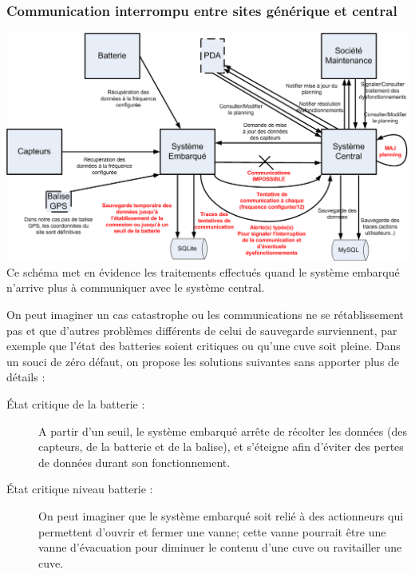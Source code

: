             \subsubsection{Communication interrompu entre sites générique et central}
            \includegraphics[width = \textwidth] {./img/CommunicationInterrompue.png}
Ce schéma met en évidence les traitements effectués quand le système embarqué n'arrive plus à communiquer 
avec le système central.

On peut imaginer un cas catastrophe ou les communications ne se rétablissement pas et que d'autres problèmes différents de celui de sauvegarde surviennent, par exemple que l'état des batteries soient critiques ou qu'une cuve soit pleine. Dans un souci de zéro défaut, on propose les solutions suivantes sans apporter plus de détails :
 \begin{description}
        \item[État critique de la batterie :] A partir d'un seuil, le système embarqué arrête de récolter les données (des capteurs, de la batterie et de la balise), et s'éteigne afin d'éviter des pertes de données durant son fonctionnement.
        \item[État critique niveau batterie :] On peut imaginer que le système embarqué soit relié à des actionneurs qui permettent d'ouvrir et fermer une vanne; cette vanne pourrait être une vanne d'évacuation pour diminuer le contenu d'une cuve ou ravitailler une cuve.
\end{description}
